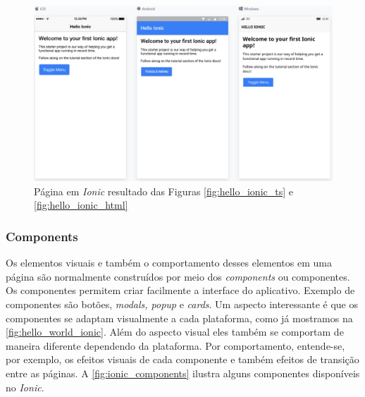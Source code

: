 \begin{figure}[h]
  \centering
  \includegraphics[scale=.4]{imagens/hello_world_ionic.png}
  \caption{Página em \textit{Ionic} resultado  das Figuras \ref{fig:hello_ionic_ts} e \ref{fig:hello_ionic_html}}
  \label{fig:hello_world_ionic}
\end{figure}

\subsubsection{Components}

Os elementos visuais e também o comportamento desses elementos em uma página
são normalmente construídos por meio dos \textit{components} ou componentes.
Os componentes permitem criar facilmente a interface do aplicativo. Exemplo de
componentes são botões, \textit{modals, popup} e \textit{cards}. Um aspecto interessante é que
os componentes se adaptam visualmente a cada plataforma, como já mostramos na \autoref{fig:hello_world_ionic}.
Além do aspecto visual eles também se comportam de maneira diferente dependendo da plataforma.
Por comportamento, entende-se, por exemplo, os efeitos visuais de cada componente e também efeitos
de  transição entre as páginas. A \autoref{fig:ionic_components} ilustra alguns componentes
disponíveis no \textit{Ionic}.

